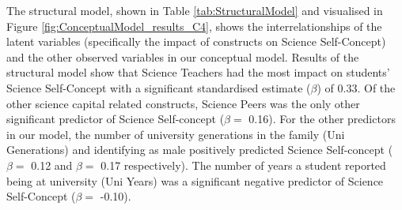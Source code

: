 The structural model, shown in Table \ref{tab:StructuralModel} and visualised in Figure \ref{fig:ConceptualModel_results_C4}, shows the interrelationships of the latent variables (specifically the impact of constructs on Science Self-Concept) and the other observed variables in our conceptual model. Results of the structural model show that Science Teachers had the most impact on students' Science Self-Concept with a significant standardised estimate ($\beta$) of 0.33. Of the other science capital related constructs, Science Peers was the only other significant predictor of Science Self-concept ($\beta =$ 0.16). For the other predictors in our model, the number of university generations in the family (Uni Generations) and identifying as male positively predicted Science Self-concept ($\beta =$ 0.12 and $\beta =$ 0.17 respectively). The number of years a student reported being at university (Uni Years) was a significant negative predictor of Science Self-Concept ($\beta =$ -0.10). 

